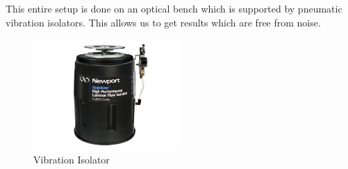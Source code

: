 This entire setup is done on an optical bench which is supported by pneumatic vibration isolators. This allows us to get results which are free from noise.
\begin{figure}[H]
	\centering
	\includegraphics[width=0.5\textwidth]{newport.jpg}
	\caption{Vibration Isolator}
	\label{fig:flow around cylinder}
\end{figure}
\setcounter{equation}{0}
\setcounter{table}{0}
\setcounter{figure}{0}
